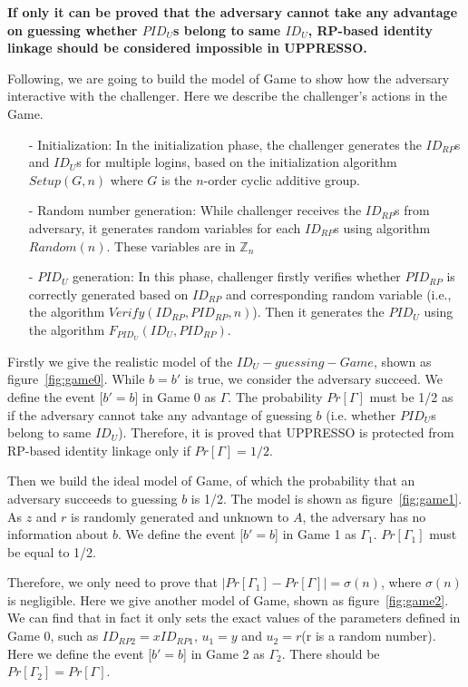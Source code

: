 \textbf{If only it can be proved that the adversary cannot take any advantage on guessing whether $PID_U$s belong to same $ID_U$, RP-based identity linkage should be considered impossible in UPPRESSO.}


Following, we are going to build the model of Game to show how the adversary interactive with the challenger. Here we describe the challenger's actions in the Game.
\begin{itemize}
\item[-] Initialization: In the initialization phase, the challenger generates the $ID_{RP}$s and $ID_U$s for multiple logins, based on the initialization algorithm $Setup(G,n)$ where $G$ is the $n$-order  cyclic additive group.
\item[-] Random number generation: While challenger receives the $ID_{RP}$s from adversary, it generates random variables for each $ID_{RP}$s using algorithm $Random(n)$. These variables are in $\mathbb{Z}_n$
\item[-] $PID_U$ generation: In this phase, challenger firstly verifies whether $PID_{RP}$ is correctly generated based on $ID_{RP}$ and corresponding random variable (i.e., the algorithm $Verify(ID_{RP},PID_{RP},n)$). Then it generates the $PID_U$ using the algorithm $F_{PID_U}(ID_U,PID_{RP})$.
\end{itemize}

Firstly we give the realistic model of the $ID_U -guessing- Game$, shown as figure~\ref{fig:game0}. While $b=b'$ is true, we consider the adversary succeed.
We define the event [$b'=b$] in Game 0 as $\Gamma$. The probability $Pr[\Gamma]$ must be 1/2 as if  the adversary cannot take any advantage of guessing $b$ (i.e.  whether $PID_U$s belong to same $ID_U$). Therefore, it is proved that UPPRESSO is protected from RP-based identity linkage only if $Pr[\Gamma]=1/2$.

Then we build the ideal model of Game, of which the probability  that an adversary succeeds to guessing $b$ is 1/2. The model is shown as figure~\ref{fig:game1}. As $z$ and $r$ is randomly generated and unknown to $A$, the adversary has no information about $b$. We  define the event [$b'=b$] in Game 1 as $\Gamma_1$. $Pr[\Gamma_1]$ must be equal to 1/2. 

Therefore, we only need to prove that $|Pr[\Gamma_1]-Pr[\Gamma]|=\sigma(n)$, where $\sigma(n)$ is negligible. Here we give another model of Game, shown as figure~\ref{fig:game2}. We can find that in fact it only sets the exact values of the parameters defined in Game 0, such as $ID_{RP2}=xID_{RP1}$, $u_1=y$ and $u_2=r$(r is a random number).  Here we define the event [$b'=b$] in Game 2 as $\Gamma_2$. There should be $Pr[\Gamma_2]=Pr[\Gamma]$.

